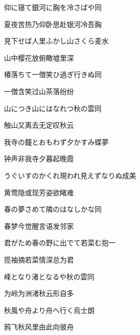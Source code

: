 \begin{haiku}
    {\FH 仰に寝て銀河に胸を冷さばや}\hfill{\FH 同}

    {\FK 夏夜苦热乃仰卧思赴银河冷吾胸}
\end{haiku}

\begin{haiku}
    {\FH 見下せば人里ふかし山さくら}\hfill{\FH 麦水}

    {\FK 山中樱花放俯瞰墟里深}
\end{haiku}

\begin{haiku}
    {\FH 椿落ちて一僧笑ひ過ぎ行きぬ}\hfill{\FH 同}

    {\FK 一僧含笑过山茶落纷纷}
\end{haiku}

\begin{haiku}
    {\FH 山につき山にはなれつ秋の雲}\hfill{\FH 同}

    {\FK 触山又离去无定叹秋云}
\end{haiku}

\begin{haiku}
    {\FH 我寺の鐘とおもわず夕かすみ}\hfill{\FH 蝶夢}

    {\FK 钟声非我寺夕暮起晚霞}
\end{haiku}

\begin{haiku}
    {\FH うぐいすのかくれ現われ見えずなりぬ}\hfill{\FH 成美}

    {\FK 黄莺隐或现芳姿欲睹难}
\end{haiku}

\begin{haiku}
    {\FH 春の夢さめて隣のはなしかな}\hfill{\FH 同}

    {\FK 春梦今觉醒言语发邻家}
\end{haiku}

\begin{haiku}
    {\FH 君がため春の野に出でて若菜む}\hfill{\FH 抱一}

    {\FK 揽袖摘若菜情深总为君}
\end{haiku}

\begin{haiku}
    {\FH 峰となり渚となるや秋の雲}\hfill{\FH 同}

    {\FK 为岭为洲渚秋云形自多}
\end{haiku}

\begin{haiku}
    {\FH 秋風や舟より舟へ行く烏}\hfill{\FH 士朗}

    {\FK 鸦飞秋风里由此向彼舟}
\end{haiku}

